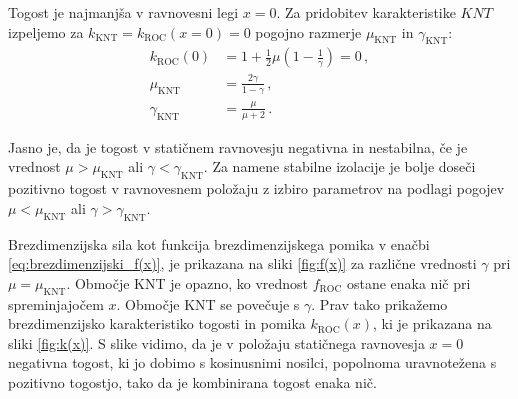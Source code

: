         Togost je najmanjša v ravnovesni legi $x=0$. Za pridobitev karakteristike $KNT$ izpeljemo za $k_{\mathrm{KNT}}=k_{\mathrm{ROC}}(x=0)=0$ pogojno razmerje $\mu_{\mathrm{KNT}}$ in $\gamma_{\mathrm{KNT}}$:
        \begin{align}
            k_{\mathrm{ROC}}(0)&=1+\frac{1}{2} \mu\left(1-\frac{1}{\gamma}\right)=0 \,, \\
            \mu_{\mathrm{KNT}}&=\frac{2 \gamma}{1-\gamma} \label{eq:KNT_pogoj_1} \,, \\  
            \gamma_{\mathrm{KNT}}&=\frac{\mu}{\mu+2} \label{eq:KNT_pogoj_2} \,.
        \end{align}
        
        Jasno je, da je togost v statičnem ravnovesju negativna in nestabilna, če je vrednost $\mu > \mu_{\mathrm{KNT}}$ ali $\gamma < \gamma_{\mathrm{KNT}}$. Za namene stabilne izolacije je bolje doseči pozitivno togost v ravnovesnem položaju z izbiro parametrov na podlagi pogojev $\mu < \mu_{\mathrm{KNT}}$ ali $\gamma > \gamma_{\mathrm{KNT}}$. 
        
        Brezdimenzijska sila kot funkcija brezdimenzijskega pomika v enačbi \eqref{eq:brezdimenzijski_f(x)}, je prikazana na sliki \ref{fig:f(x)} za različne vrednosti $\gamma$ pri $\mu=\mu_{\mathrm{KNT}}$. Območje KNT je opazno, ko vrednost $f_{\mathrm{ROC}}$ ostane enaka nič pri spreminjajočem $x$. Območje KNT se povečuje s $\gamma$. Prav tako prikažemo  brezdimenzijsko karakteristiko togosti in pomika $k_{\mathrm{ROC}}(x)$, ki je prikazana na sliki \ref{fig:k(x)}. S slike vidimo, da je v položaju statičnega ravnovesja $x=0$ negativna togost, ki jo dobimo s kosinusnimi nosilci, popolnoma uravnotežena s pozitivno togostjo, tako da je kombinirana togost enaka nič.
        
